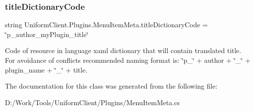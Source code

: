 \subsubsection{\texorpdfstring{title\+Dictionary\+Code}{titleDictionaryCode}}
{\footnotesize\ttfamily string Uniform\+Client.\+Plugins.\+Menu\+Item\+Meta.\+title\+Dictionary\+Code = \char`\"{}p\+\_\+author\+\_\+my\+Plugin\+\_\+title\char`\"{}}



Code of resource in language xaml dictionary that will contain translated title. For avoidance of conflicts recommended naming format is\+: \char`\"{}p\+\_\+\char`\"{} + author + \char`\"{}\+\_\+\char`\"{} + plugin\+\_\+name + \char`\"{}\+\_\+\char`\"{} + title. 



The documentation for this class was generated from the following file\+:\begin{DoxyCompactItemize}
\item 
D\+:/\+Work/\+Tools/\+Uniform\+Client/\+Plugins/Menu\+Item\+Meta.\+cs\end{DoxyCompactItemize}
